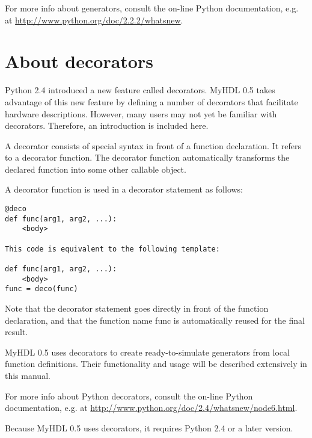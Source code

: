 For more info about generators, consult the on-line Python
documentation, e.g. at \url{http://www.python.org/doc/2.2.2/whatsnew}. 


\section{About decorators \label{deco}}

Python 2.4 introduced a new feature called decorators. MyHDL 0.5 takes
advantage of this new feature by defining a number of decorators that
facilitate hardware descriptions. However, many users may not yet be familiar with
decorators. Therefore, an introduction is included here.

A decorator consists of special syntax in front of a function
declaration. It refers to a decorator function. The decorator function
automatically transforms the declared function into some other
callable object.

A decorator function  is used in a decorator statement as follows:

\begin{verbatim}
@deco
def func(arg1, arg2, ...):
    <body>

This code is equivalent to the following template:

def func(arg1, arg2, ...):
    <body>
func = deco(func)
\end{verbatim}

Note that the decorator statement goes directly in front of the
function declaration, and that the function name func is automatically
reused for the final result.

MyHDL 0.5 uses decorators to create ready-to-simulate generators
from local function definitions. Their functionality
and usage will be described extensively in this manual.

For more info about Python decorators, consult the on-line Python
documentation, e.g. at \url{http://www.python.org/doc/2.4/whatsnew/node6.html}.

\begin{notice}[warning]
Because MyHDL 0.5 uses decorators, it requires Python 2.4 or a
later version.
\end{notice}

